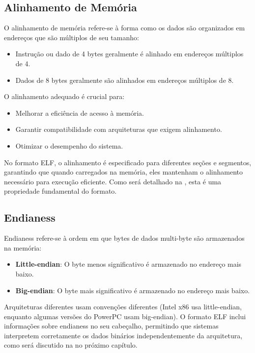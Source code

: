 \subsection{Alinhamento de Memória}\label{subsec:alignment}

O alinhamento de memória refere-se à forma como os dados são organizados em endereços que são múltiplos de seu tamanho:

\begin{itemize}
    \item Instrução ou dado de 4 bytes geralmente é alinhado em endereços múltiplos de 4.
    \item Dados de 8 bytes geralmente são alinhados em endereços múltiplos de 8.
\end{itemize}

O alinhamento adequado é crucial para:
\begin{itemize}
    \item Melhorar a eficiência de acesso à memória.
    \item Garantir compatibilidade com arquiteturas que exigem alinhamento.
    \item Otimizar o desempenho do sistema.
\end{itemize}

No formato ELF, o alinhamento é especificado para diferentes seções e segmentos, garantindo que quando carregados na memória, eles mantenham o alinhamento necessário para execução eficiente. Como será detalhado na , esta é uma propriedade fundamental do formato.

\subsection{Endianess}\label{subsec:endianness}

Endianess refere-se à ordem em que bytes de dados multi-byte são armazenados na memória:

\begin{itemize}
    \item \textbf{Little-endian}: O byte menos significativo é armazenado no endereço mais baixo.
    \item \textbf{Big-endian}: O byte mais significativo é armazenado no endereço mais baixo.
\end{itemize}

Arquiteturas diferentes usam convenções diferentes (Intel x86 usa little-endian, enquanto algumas versões do PowerPC usam big-endian). O formato ELF inclui informações sobre endianess no seu cabeçalho, permitindo que sistemas interpretem corretamente os dados binários independentemente da arquitetura, como será discutido na  no próximo capítulo.